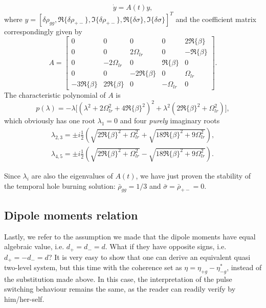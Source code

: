 \documentclass[onecolumn,secnumarabic,amssymb, nobibnotes, aip, prd]{revtex4-1}
\begin{document}
\begin{equation}
\dot{y} = A(t)y,
\end{equation}
where $y =[\delta\rho_{gg},\Re\{\delta\rho_{+-}\},\Im\{\delta\rho_{+-}\},\Re\{\delta\sigma\},\Im\{\delta\sigma\}]^T$ and the coefficient matrix correspondingly given by
\begin{equation}
A = \begin{bmatrix} 0 & 0 & 0 & 0 & 2\Re\{\beta\} \\
0  & 0 & 2\Omega_{lr} & 0 & -\Re\{\beta\} \\
0 & -2\Omega_{lr} & 0 & \Re\{\beta\} & 0 \\
0 & 0 & -2\Re\{\beta\} & 0 & \Omega_{lr} \\
-3\Re\{\beta\} & 2\Re\{\beta\} & 0 & -\Omega_{lr} & 0  
\end{bmatrix}.
\end{equation} 
The characteristic polynomial of $A$ is 
\begin{equation}
p(\lambda) = -\lambda\big[ (\lambda^2+2\Omega_{lr}^2+4\Re\{\beta\}^2 )^2+\lambda^2(2\Re\{\beta\}^2+\Omega_{lr}^2)\big],
\end{equation} which obviously has one root $\lambda_{1} =0 $ and four \emph{purely} imaginary roots 
\begin{subequations}
	\label{eq:eigenvalues}
	\begin{align}
	\lambda_{2,3} = \pm i\frac{1}{2}\left(\sqrt{2\Re\{\beta\}^2+\Omega_{lr}^2} + \sqrt{18\Re\{\beta\}^2+9\Omega_{lr}^2} \right),  \\
	\lambda_{4,5} =  \pm i\frac{1}{2}\left(\sqrt{2\Re\{\beta\}^2+\Omega_{lr}^2} - \sqrt{18\Re\{\beta\}^2+9\Omega_{lr}^2} \right). 
	\end{align}
\end{subequations}

Since $\lambda_i$ are also the eigenvalues of $A(t)$, we have just proven the stability of the temporal hole burning solution: $\bar\rho_{gg} = 1/3$ and $\bar\sigma = \bar\rho_{+-}=0$. 

\subsection{Dipole moments relation}
\label{sec:sup-dipole}
Lastly, we refer to the assumption we made that the dipole moments have equal algebraic value, i.e. $d_{+} = d_{-} = d$. What if they have opposite signs, i.e. $d_{+} = -d_{-} = d$? It is very easy to show that one can derive an equivalent quasi two-level system, but this time with the coherence set as $\eta = \eta_{+g}-\eta_{-g}^*$, instead of the substitution made above. In this case, the interpretation of the pulse switching behaviour remains the same, as the reader can readily verify by him/her-self.




	
	
	
	

\end{document}

